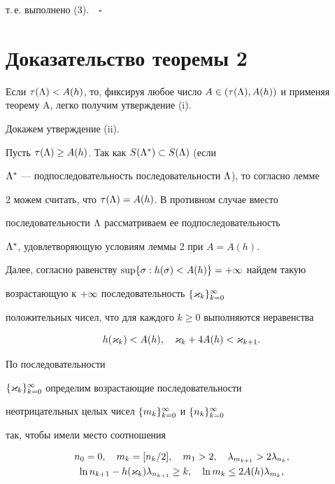 т.\,е. выполнено (3).$\quad\square$








\section{Доказательство теоремы 2}





Если $\tau(\L)< A(h)$, то, фиксируя любое число $A\in (\tau(\L),


A(h))$ и применяя теорему A, легко получим утверждение (i).


Докажем утверждение (ii). 





Пусть $\tau(\Lambda)\ge A(h)$. Так как $S(\Lambda^*)\subset S(\Lambda)$ (если


$\Lambda^*$ --- подпоследовательность последовательности $\Lambda$), то согласно лемме


2 можем считать, что $\tau(\Lambda)=A(h)$. В противном случае вместо


последовательности $\Lambda$ рассматриваем ее подпоследовательность


$\Lambda^*$, удовлетворяющую условиям леммы 2 при $A=A(h)$. 





Далее, согласно равенству $\sup\{\sigma:h(\sigma)<A(h)\}=+\infty$ найдем такую


возрастающую к $+\infty$ последовательность $\{\varkappa_k\}_{k=0}^\infty$


положительных чисел, что для каждого $k\ge 0$ выполняются неравенства


\begin{equation}


h(\k_k)<A(h),\q \k_k+4A(h)<\k_{k+1}.


\end{equation}





По последовательности


$\{\varkappa_k\}_{k=0}^\infty$ определим возрастающие последовательности


неотрицательных целых чисел $\{m_k\}_{k=0}^\infty$ и $\{n_k\}_{k=0}^\infty$


так, чтобы имели место соотношения


\begin{gather}


n_0=0,\q m_k=[n_k/2],\q m_1>2,\q \l_{m_{k+1}}>2\l_{n_k},\\


%


\ln n_{k+1}-h(\k_k)\l_{n_{k+1}}\ge k,\q \ln m_k\le 2A(h)\l_{m_k},


\end{gather}


